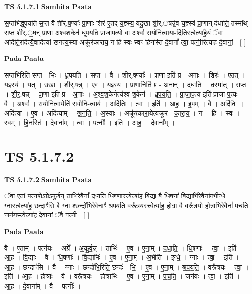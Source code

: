 \documentclass[17pt]{extarticle}
\begin{document}
\textbf{TS 5.1.7.1 } \newline
\textbf{Samhita Paata} \newline

स॒प्तभि॑र्द्धूपयति स॒प्त वै शी॑र्.ष॒ण्याः᳚ प्रा॒णाः शिर॑ ए॒तद्-य॒ज्ञ्स्य॒ यदु॒खा शी॒र्.॒षन्ने॒व य॒ज्ञ्स्य॑ प्रा॒णान् द॑धाति॒ तस्मा᳚थ् स॒प्त शी॒र्.॒षन् प्रा॒णा अ॑श्वश॒केन॑ धूपयति प्राजाप॒त्यो वा अश्वः॑ सयोनि॒त्वाया-दि॑ति॒स्त्वेत्या॑हे॒यं ॅवा अदि॑ति॒रदि॑त्यै॒वादि॑त्यां खनत्य॒स्या अक्रू॑रंकाराय॒ न हि स्वः स्वꣳ हि॒नस्ति॑ दे॒वानां᳚ त्वा॒ पत्नी॒रित्या॑ह दे॒वानां॒ - [  ] \newline

\textbf{Pada Paata} \newline

स॒प्तभि॒रिति॑ स॒प्त - भिः॒ । धू॒प॒य॒ति॒ । स॒प्त । वै । शी॒र्॒.ष॒ण्याः᳚ । प्रा॒णा इति॑ प्र - अ॒नाः । शिरः॑ । ए॒तत् । य॒ज्ञ्स्य॑ । यत् । उ॒खा । शी॒र्॒.षन्न् । ए॒व । य॒ज्ञ्स्य॑ । प्रा॒णानिति॑ प्र - अ॒नान् । द॒धा॒ति॒ । तस्मा᳚त् । स॒प्त । शी॒र॒.षन्न् । प्रा॒णा इति॑ प्र - अ॒नाः । अ॒श्व॒श॒केनेत्य॑श्व-श॒केन॑ । धू॒प॒य॒ति॒ । प्रा॒जा॒प॒त्य इति॑ प्राजा-प॒त्यः । वै । अश्वः॑ । स॒यो॒नि॒त्वायेति॑ सयोनि-त्वाय॑ । अदि॑तिः । त्वा॒ । इति॑ । आ॒ह॒ । इ॒यम् । वै । अदि॑तिः । अदि॑त्या । ए॒व । अदि॑त्याम् । ख॒न॒ति॒ । अ॒स्याः । अक्रू॑रंकारा॒येत्यक्रू॑रं - का॒रा॒य॒ । न । हि । स्वः । स्वम् । हि॒नस्ति॑ । दे॒वाना᳚म् । त्वा॒ । पत्नीः᳚ । इति॑ । आ॒ह॒ । दे॒वाना᳚म् ।  \newline





\section{ TS 5.1.7.2 }

\textbf{TS 5.1.7.2 } \newline
\textbf{Samhita Paata} \newline

ॅवा ए॒तां पत्न॒योऽग्रे॑ऽकुर्व॒न् ताभि॑रे॒वैनां᳚ दधाति धि॒षणा॒स्त्वेत्या॑ह वि॒द्या वै धि॒षणा॑ वि॒द्याभि॑रे॒वैना॑म॒भीन्धे॒ ग्नास्त्वेत्या॑ह॒ छन्दाꣳ॑सि॒ वै ग्ना श्छन्दो॑भिरे॒वैनाꣳ॑ श्रपयति॒ वरू᳚त्रय॒स्त्त्वेत्या॑ह॒ होत्रा॒ वै वरू᳚त्रयो॒ होत्रा॑भिरे॒वैनां᳚ पचति॒ जन॑य॒स्त्वेत्या॑ह दे॒वानां॒ ॅवै पत्नी॒ - [  ] \newline

\textbf{Pada Paata} \newline

वै । ए॒ताम् । पत्न॑यः । अग्रे᳚ । अ॒कु॒र्व॒न्न् । ताभिः॑ । ए॒व । ए॒ना॒म् । द॒धा॒ति॒ । धि॒षणाः᳚ । त्वा॒ । इति॑ । आ॒ह॒ । वि॒द्याः । वै । धि॒षणाः᳚ । वि॒द्याभिः॑ । ए॒व । ए॒ना॒म् । अ॒भीति॑ । इ॒न्धे॒ । ग्नाः । त्वा॒ । इति॑ । आ॒ह॒ । छन्दाꣳ॑सि । वै । ग्नाः । छन्दो॑भि॒रिति॒ छन्दः॑ - भिः॒ । ए॒व । ए॒ना॒म् । श्र॒प॒य॒ति॒ । वरू᳚त्रयः । त्वा॒ । इति॑ । आ॒ह॒ । होत्राः᳚ । वै । वरू᳚त्रयः । होत्रा॑भिः । ए॒व । ए॒ना॒म् । प॒च॒ति॒ । जन॑यः । त्वा॒ । इति॑ । आ॒ह॒ । दे॒वाना᳚म् । वै । पत्नीः᳚ ।  \newline
\end{document}
